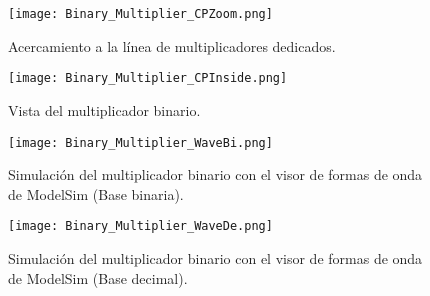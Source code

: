 \begin{figure}[ht]
	\centering
	\texttt{[image: Binary\_Multiplier\_CPZoom.png]}
	\caption {Acercamiento a la línea de multiplicadores dedicados. \label{fig:binary_multiplier_CPZoom}}
\end{figure}

\begin{figure}[ht]
	\centering
	\texttt{[image: Binary\_Multiplier\_CPInside.png]}
	\caption{Vista del multiplicador binario. \label{fig:binary_multiplier_CPInside}}
\end{figure}

\begin{figure}[ht]
	\centering
	\texttt{[image: Binary\_Multiplier\_WaveBi.png]}
	\caption{Simulación del multiplicador binario con el visor de formas de onda de ModelSim (Base binaria). \label{fig:binary_multiplier_WaveBi}}
\end{figure}

\begin{figure}[ht]
	\centering
	\texttt{[image: Binary\_Multiplier\_WaveDe.png]}
	\caption{Simulación del multiplicador binario con el visor de formas de onda de ModelSim (Base decimal). \label{fig:binary_multiplier_WaveDe}}
\end{figure}
